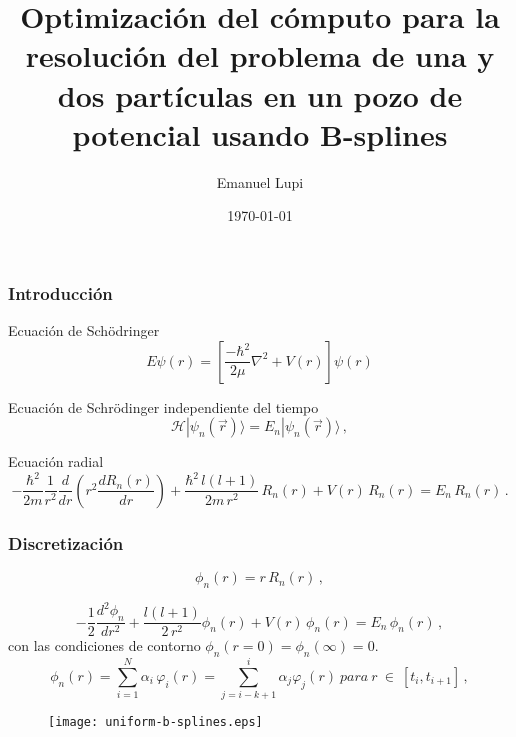 \documentclass{beamer}
\title[]{Optimizaci\'on del c\'omputo para la resoluci\'on del problema de una y dos part\'iculas en un pozo de potencial usando B-splines}
\author[]{Emanuel Lupi}
\institute[]
{
  Universidad Nacional de C\'ordoba\\
  FaMAF
}
\date{\today}
\begin{document}
\frame{\titlepage}




\begin{frame}
  \frametitle{Introducci\'on}
  \begin{block}{Ecuaci\'on de Sch\"odringer}
    \begin{displaymath}
        E\psi(r) = \left[\frac{-\hbar^2}{2\mu} \nabla^2 + V(r)\right]\psi(r)
    \end{displaymath}
  \end{block}

  \begin{block}{Ecuaci\'on de Schr\"odinger independiente del tiempo}
      \begin{displaymath}\label{ec_schrodinger}
        \mathcal{H} |\psi_n(\vec{r})\rangle = E_n |\psi_n(\vec{r})\rangle\,,
      \end{displaymath}
  \end{block}

  \begin{block}{Ecuaci\'on radial}
    \begin{displaymath}
        -\frac{\hbar^2}{2m} \frac{1}{r^2}\frac{d}{dr}\left(r^2\frac{dR_n(r)}{dr}\right) 
        + \frac{\hbar^2\,l(l+1)}{2m\,r^2}\,R_n(r) + V(r)\,R_n(r) = E_n\,R_n(r)\,.
    \end{displaymath}
  \end{block}
\end{frame}


\begin{frame}
  \frametitle{Discretizaci\'on}
    
  \begin{displaymath}
    \phi_n(r) = r\,R_n(r)\,,
  \end{displaymath} 

  \begin{displaymath}
    -\frac{1}{2} \frac{d^2 \phi_n}{dr^2} + \frac{l(l+1)}{2\,r^2} \phi_n(r) + V(r)\,\phi_n(r) = E_n\,\phi_n(r)\,,
  \end{displaymath} 
  con las condiciones de contorno $\phi_n(r=0)=\phi_n(\infty) = 0$.
  \begin{displaymath}\label{combinacion_lineal}
      \phi_n(r)=\sum_{i=1}^{N}\alpha_i\,\varphi_i(r) = \sum_{j=i-k+1}^{i}\alpha_j\varphi_j(r)\ para\ r\ \in\ [t_i, t_{i+1}]\,,
  \end{displaymath}

  \begin{figure}[!tbp]
    \centering
    \texttt{[image: uniform-b-splines.eps]}
  \end{figure}
\end{frame}
\end{document}
